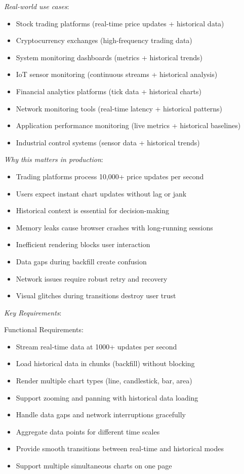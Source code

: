 \documentclass[11pt]{article}
\begin{document}
\emph{Real-world use cases}:

\begin{itemize}
\item Stock trading platforms (real-time price updates + historical data)
\item Cryptocurrency exchanges (high-frequency trading data)
\item System monitoring dashboards (metrics + historical trends)
\item IoT sensor monitoring (continuous streams + historical analysis)
\item Financial analytics platforms (tick data + historical charts)
\item Network monitoring tools (real-time latency + historical patterns)
\item Application performance monitoring (live metrics + historical baselines)
\item Industrial control systems (sensor data + historical trends)
\end{itemize}

\emph{Why this matters in production}:

\begin{itemize}
\item Trading platforms process 10,000+ price updates per second
\item Users expect instant chart updates without lag or jank
\item Historical context is essential for decision-making
\item Memory leaks cause browser crashes with long-running sessions
\item Inefficient rendering blocks user interaction
\item Data gaps during backfill create confusion
\item Network issues require robust retry and recovery
\item Visual glitches during transitions destroy user trust
\end{itemize}

\emph{Key Requirements}:

Functional Requirements:

\begin{itemize}
\item Stream real-time data at 1000+ updates per second
\item Load historical data in chunks (backfill) without blocking
\item Render multiple chart types (line, candlestick, bar, area)
\item Support zooming and panning with historical data loading
\item Handle data gaps and network interruptions gracefully
\item Aggregate data points for different time scales
\item Provide smooth transitions between real-time and historical modes
\item Support multiple simultaneous charts on one page
\end{itemize}
\end{document}

